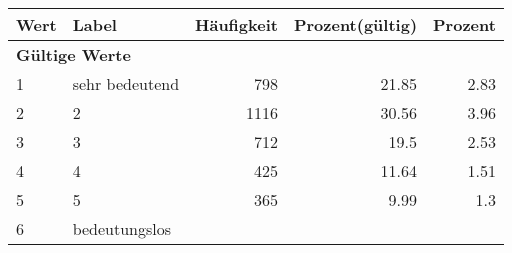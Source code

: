      \begin{longtable}{lXrrr}
     \toprule
     \textbf{Wert} & \textbf{Label} & \textbf{Häufigkeit} & \textbf{Prozent(gültig)} & \textbf{Prozent} \\
     \endhead
     \midrule
     \multicolumn{5}{l}{\textbf{Gültige Werte}}\\

     1 &
     \multicolumn{1}{X}{ sehr bedeutend   } &


       \num{798} &
       \num[round-mode=places,round-precision=2]{21.85} &
         \num[round-mode=places,round-precision=2]{2.83} \\

     2 &
     \multicolumn{1}{X}{ 2   } &


       \num{1116} &
       \num[round-mode=places,round-precision=2]{30.56} &
         \num[round-mode=places,round-precision=2]{3.96} \\

     3 &
     \multicolumn{1}{X}{ 3   } &


       \num{712} &
       \num[round-mode=places,round-precision=2]{19.5} &
         \num[round-mode=places,round-precision=2]{2.53} \\

     4 &
     \multicolumn{1}{X}{ 4   } &


       \num{425} &
       \num[round-mode=places,round-precision=2]{11.64} &
         \num[round-mode=places,round-precision=2]{1.51} \\

     5 &
     \multicolumn{1}{X}{ 5   } &


       \num{365} &
       \num[round-mode=places,round-precision=2]{9.99} &
         \num[round-mode=places,round-precision=2]{1.3} \\

     6 &
     \multicolumn{1}{X}{ bedeutungslos   } &



\end{longtable}
